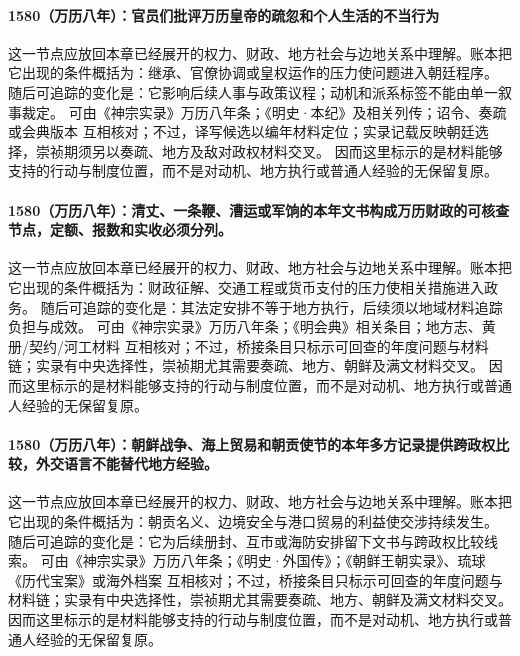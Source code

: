 \paragraph{1580（万历八年）：官员们批评万历皇帝的疏忽和个人生活的不当行为} 这一节点应放回本章已经展开的权力、财政、地方社会与边地关系中理解。账本把它出现的条件概括为：继承、官僚协调或皇权运作的压力使问题进入朝廷程序。 随后可追踪的变化是：它影响后续人事与政策议程；动机和派系标签不能由单一叙事裁定。 可由《神宗实录》万历八年条；《明史·本纪》及相关列传；诏令、奏疏或会典版本 互相核对；不过，译写候选以编年材料定位；实录记载反映朝廷选择，崇祯期须另以奏疏、地方及敌对政权材料交叉。 因而这里标示的是材料能够支持的行动与制度位置，而不是对动机、地方执行或普通人经验的无保留复原。

\paragraph{1580（万历八年）：清丈、一条鞭、漕运或军饷的本年文书构成万历财政的可核查节点，定额、报数和实收必须分列。} 这一节点应放回本章已经展开的权力、财政、地方社会与边地关系中理解。账本把它出现的条件概括为：财政征解、交通工程或货币支付的压力使相关措施进入政务。 随后可追踪的变化是：其法定安排不等于地方执行，后续须以地域材料追踪负担与成效。 可由《神宗实录》万历八年条；《明会典》相关条目；地方志、黄册/契约/河工材料 互相核对；不过，桥接条目只标示可回查的年度问题与材料链；实录有中央选择性，崇祯期尤其需要奏疏、地方、朝鲜及满文材料交叉。 因而这里标示的是材料能够支持的行动与制度位置，而不是对动机、地方执行或普通人经验的无保留复原。

\paragraph{1580（万历八年）：朝鲜战争、海上贸易和朝贡使节的本年多方记录提供跨政权比较，外交语言不能替代地方经验。} 这一节点应放回本章已经展开的权力、财政、地方社会与边地关系中理解。账本把它出现的条件概括为：朝贡名义、边境安全与港口贸易的利益使交涉持续发生。 随后可追踪的变化是：它为后续册封、互市或海防安排留下文书与跨政权比较线索。 可由《神宗实录》万历八年条；《明史·外国传》；《朝鲜王朝实录》、琉球《历代宝案》或海外档案 互相核对；不过，桥接条目只标示可回查的年度问题与材料链；实录有中央选择性，崇祯期尤其需要奏疏、地方、朝鲜及满文材料交叉。 因而这里标示的是材料能够支持的行动与制度位置，而不是对动机、地方执行或普通人经验的无保留复原。

